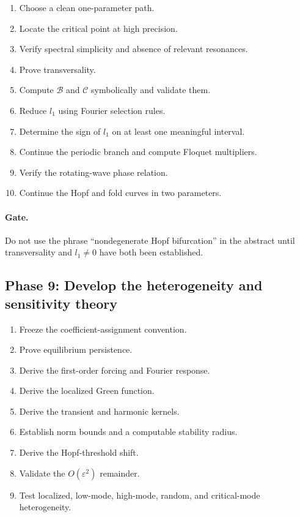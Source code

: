 \documentclass[11pt, reqno]{amsart}
\theoremstyle{definition}
\theoremstyle{remark}
\newcommand{\eps}{\varepsilon}
\begin{document}
\begin{enumerate}[label=8.\arabic*,leftmargin=3em]
    \item Choose a clean one-parameter path.
    \item Locate the critical point at high precision.
    \item Verify spectral simplicity and absence of relevant resonances.
    \item Prove transversality.
    \item Compute $\mathcal B$ and $\mathcal C$ symbolically and validate them.
    \item Reduce $l_1$ using Fourier selection rules.
    \item Determine the sign of $l_1$ on at least one meaningful interval.
    \item Continue the periodic branch and compute Floquet multipliers.
    \item Verify the rotating-wave phase relation.
    \item Continue the Hopf and fold curves in two parameters.
\end{enumerate}

\paragraph{Gate.}
Do not use the phrase ``nondegenerate Hopf bifurcation'' in the abstract until
transversality and $l_1\ne0$ have both been established.

\subsection{Phase 9: Develop the heterogeneity and sensitivity theory}

\begin{enumerate}[label=9.\arabic*,leftmargin=3em]
    \item Freeze the coefficient-assignment convention.
    \item Prove equilibrium persistence.
    \item Derive the first-order forcing and Fourier response.
    \item Derive the localized Green function.
    \item Derive the transient and harmonic kernels.
    \item Establish norm bounds and a computable stability radius.
    \item Derive the Hopf-threshold shift.
    \item Validate the $O(\eps^2)$ remainder.
    \item Test localized, low-mode, high-mode, random, and critical-mode
    heterogeneity.
\end{enumerate}
\end{document}
